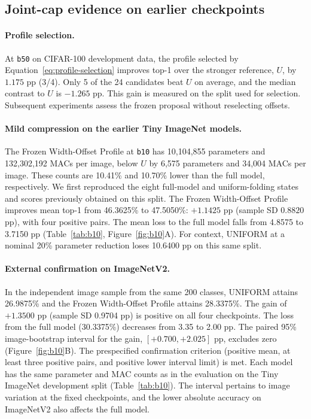 \documentclass[11pt,a4paper]{article}
\newcommand{\Uniform}{UNIFORM}
\newcommand{\FrozenProfile}{Frozen Width-Offset Profile}
\newcommand{\bten}{\texttt{b10}}
\newcommand{\bfifty}{\texttt{b50}}
\begin{document}
\subsection{Joint-cap evidence on earlier checkpoints}

\paragraph{Profile selection.} At \bfifty{} on CIFAR-100 development
data, the profile selected by Equation~\eqref{eq:profile-selection}
improves top-1 over the stronger reference, $U$, by $1.175$ pp (3/4).
Only 5 of the 24 candidates beat $U$ on average, and the median contrast
to $U$ is $-1.265$ pp. This gain is measured on the split used for
selection. Subsequent experiments assess the frozen proposal without
reselecting offsets.

\paragraph{Mild compression on the earlier Tiny ImageNet models.} The
\FrozenProfile{} at \bten{} has 10,104,855 parameters and 132,302,192 MACs
per image, below $U$ by 6,575 parameters and 34,004 MACs per image. These
counts are 10.41\% and 10.70\% lower than the full model, respectively.
We first reproduced the eight full-model and uniform-folding states and
scores previously obtained on this split. The \FrozenProfile{}
improves mean top-1 from 46.3625\% to 47.5050\%: $+1.1425$ pp (sample SD
$0.8820$ pp), with four positive pairs. The mean loss to the full model
falls from 4.8575 to 3.7150 pp (Table~\ref{tab:b10},
Figure~\ref{fig:b10}A). For context, \Uniform{} at a nominal
20\% parameter reduction loses 10.6400 pp on this same split.

\paragraph{External confirmation on ImageNetV2.} In the independent
image sample from the same 200 classes, \Uniform{} attains 26.9875\%
and the \FrozenProfile{} attains 28.3375\%. The gain of $+1.3500$ pp (sample SD 0.9704 pp)
is positive on all four checkpoints. The loss from the full model (30.3375\%)
decreases from 3.35 to 2.00 pp. The paired 95\% image-bootstrap interval
for the gain, $[+0.700,+2.025]$ pp, excludes zero (Figure~\ref{fig:b10}B).
The prespecified confirmation criterion (positive mean, at least three
positive pairs, and positive lower interval limit) is met. Each model has
the same parameter and MAC counts as in the evaluation on the Tiny
ImageNet development split (Table~\ref{tab:b10}). The interval pertains
to image variation at the fixed checkpoints, and the lower absolute
accuracy on ImageNetV2 also affects the full model.
\end{document}
